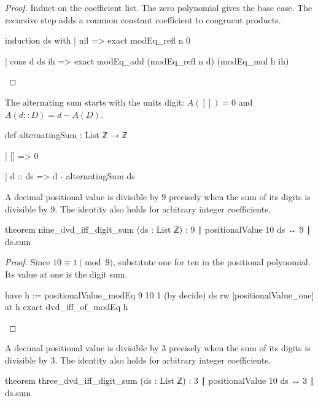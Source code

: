 \begin{proof}
  Induct on the coefficient list.
  The zero polynomial gives the base case.
  The recursive step adds a common constant coefficient to congruent products.

  \begin{lean}
    induction ds with
    | nil => exact modEq_refl n 0

    | cons d ds ih => exact modEq_add (modEq_refl n d) (modEq_mul h ih)
  \end{lean}
\end{proof}

\begin{definition}
  The alternating sum starts with the units digit: $A([])=0$ and $A(d::D)=d-A(D)$.

  \begin{lean}
    def alternatingSum : List ℤ → ℤ

      | [] => 0

      | d :: ds => d - alternatingSum ds
  \end{lean}
\end{definition}

\begin{theorem}
  \label{ent:thm:nine-dvd-iff-digit-sum}
  A decimal positional value is divisible by $9$ precisely when the sum of its digits is divisible
  by $9$.
  The identity also holds for arbitrary integer coefficients.

  \begin{lean}
    theorem nine_dvd_iff_digit_sum (ds : List ℤ) :
        9 ∣ positionalValue 10 ds ↔ 9 ∣ ds.sum
  \end{lean}
\end{theorem}

\begin{proof}
  Since $10\equiv1\pmod9$, substitute one for ten in the positional polynomial.
  Its value at one is the digit sum.

  \begin{lean}
    have h := positionalValue_modEq 9 10 1 (by decide) ds
    rw [positionalValue_one] at h
    exact dvd_iff_of_modEq h
  \end{lean}
\end{proof}

\begin{theorem}
  \label{ent:thm:three-dvd-iff-digit-sum}
  A decimal positional value is divisible by $3$ precisely when the sum of its digits is divisible
  by $3$.
  The identity also holds for arbitrary integer coefficients.

  \begin{lean}
    theorem three_dvd_iff_digit_sum (ds : List ℤ) :
        3 ∣ positionalValue 10 ds ↔ 3 ∣ ds.sum
  \end{lean}
\end{theorem}

